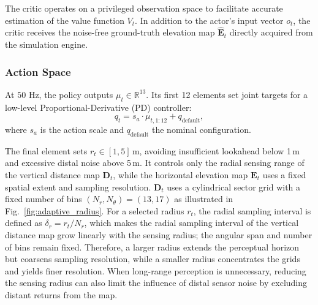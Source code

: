 \documentclass[letterpaper, 10 pt, conference]{ieeeconf/ieeeconf}
\DeclareRobustCommand{\RevisionAdd}[1]{{\color{red}#1}}
\begin{document}
\begin{itemize}
\end{itemize}

The critic operates on a privileged observation space to facilitate accurate estimation of the value function $V_t$. In addition to the actor's input vector $o_t$, the critic receives the noise-free ground-truth elevation map $\hat{\mathbf{E}}_t$ directly acquired from the simulation engine.


\subsubsection{Action Space}

\RevisionAdd{At $50$ Hz, the policy outputs $\mu_t\in\mathbb{R}^{13}$. Its first 12 elements set joint targets for a low-level Proportional-Derivative (PD) controller:
\begin{equation}
    q_t = s_a \cdot \mu_{t,1:12} + q_{\text{default}},
\end{equation}
where $s_a$ is the action scale and $q_{\text{default}}$ the nominal configuration. }

\RevisionAdd{The final element sets $r_t\in[1,5]$\,m, avoiding insufficient lookahead below 1\,m and excessive distal noise above 5\,m.
It controls only the radial sensing range of the vertical distance map $\mathbf{D}_t$, while the horizontal elevation map $\mathbf{E}_t$ uses a fixed spatial extent and sampling resolution. 
$\mathbf{D}_t$ uses a cylindrical sector grid with a fixed number of bins $(N_r, N_\theta) = (13, 17)$ as illustrated in Fig.~\ref{fig:adaptive_radius}. For a selected radius $r_{t}$, the radial sampling interval is defined as
$\delta_r = {r_{t}}/{N_r}$,
which makes the radial sampling interval of the vertical distance map grow linearly with the sensing radius; the angular span and number of bins remain fixed. Therefore, a larger radius extends the perceptual horizon but coarsens sampling resolution, while a smaller radius concentrates the grids and yields finer resolution. When long-range perception is unnecessary, reducing the sensing radius can also limit the influence of distal sensor noise by excluding distant returns from the map.}
\end{document}
